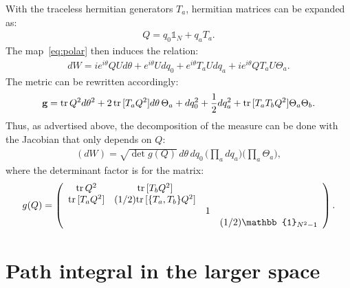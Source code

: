 \documentclass[12pt]{article}
\begin{document}
With the traceless hermitian generators $T_a$,
hermitian matrices can be expanded as:
\begin{align}
  Q = q_0 \mathbb{1}_N + q_a T_a.
\end{align}
The map~\eqref{eq:polar} then induces the relation:
\begin{align}
  dW
  =
  i e^{i\theta} Q U d\theta
  +
  e^{i\theta} U dq_0
  +
  e^{i\theta} T_a U dq_a
  +
  i e^{i\theta} Q T_a U \Theta_a.
  \label{eq:expand_dw}
\end{align}
The metric can be rewritten accordingly:
\begin{align}
  \textbf{g}
  =
  {\rm tr}\, Q^2  d\theta^2
  +
  2 \, {\rm tr}\,[T_a Q^2] d\theta \, \Theta_a
  +
  dq_0^2
  +
  \frac{1}{2} dq_a^2
  +
  {\rm tr}\, [T_a T_b Q^2]  \Theta_a \Theta_b.
\end{align}
Thus, as advertised above,
the decomposition of the measure can be done with the
Jacobian that only depends on $Q$:
\begin{align}
  (dW)
  =
  \sqrt{\det g(Q)}
  \,
  d\theta
  \,
  dq_0
  \,
  \Big(\prod_a dq_a\Big)
  \Big(\prod_a \Theta_a \Big),
  \label{eq:measure_w}
\end{align}
where the determinant factor is for the matrix:
\begin{align}
  g(Q) =
  \left(
  \begin{array}{c c c c}
    {\rm tr}\, Q^2 & {\rm tr}\,[T_b Q^2] & & \\
    {\rm tr}\,[T_a Q^2] & (1/2){\rm tr}\,[\{T_a, T_b\} Q^2] & & \\
                   && 1 & \\
                   && & (1/2)\mathbb{1}_{N^2-1}
  \end{array}
  \right).
\end{align}


\section{Path integral in the larger space}
\label{sec:path_integral}
\end{document}
